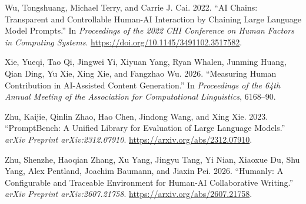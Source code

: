 \documentclass[
]{article}
\newlength{\cslhangindent}
\newenvironment{CSLReferences}[2] %
 {\begin{list}{}{%
  \setlength{\itemindent}{0pt}
  \setlength{\leftmargin}{0pt}
  \setlength{\parsep}{0pt}
  \ifodd #1
   \setlength{\leftmargin}{\cslhangindent}
   \setlength{\itemindent}{-1\cslhangindent}
  \fi
  \setlength{\itemsep}{#2\baselineskip}}}
 {\end{list}}
\begin{document}
\begin{CSLReferences}{1}{0}
Wu, Tongshuang, Michael Terry, and Carrie J. Cai. 2022. {``AI Chains:
Transparent and Controllable Human-AI Interaction by Chaining Large
Language Model Prompts.''} In \emph{Proceedings of the 2022 CHI
Conference on Human Factors in Computing Systems}.
\url{https://doi.org/10.1145/3491102.3517582}.

Xie, Yueqi, Tao Qi, Jingwei Yi, Xiyuan Yang, Ryan Whalen, Junming Huang,
Qian Ding, Yu Xie, Xing Xie, and Fangzhao Wu. 2026. {``Measuring Human
Contribution in AI-Assisted Content Generation.''} In \emph{Proceedings
of the 64th Annual Meeting of the Association for Computational
Linguistics}, 6168--90.

Zhu, Kaijie, Qinlin Zhao, Hao Chen, Jindong Wang, and Xing Xie. 2023.
{``PromptBench: A Unified Library for Evaluation of Large Language
Models.''} \emph{arXiv Preprint arXiv:2312.07910}.
\url{https://arxiv.org/abs/2312.07910}.

Zhu, Shenzhe, Haoqian Zhang, Xu Yang, Jingyu Tang, Yi Nian, Xiaoxue Du,
Shu Yang, Alex Pentland, Joachim Baumann, and Jiaxin Pei. 2026.
{``Humanly: A Configurable and Traceable Environment for Human-AI
Collaborative Writing.''} \emph{arXiv Preprint arXiv:2607.21758}.
\url{https://arxiv.org/abs/2607.21758}.

\end{CSLReferences}
\end{document}
